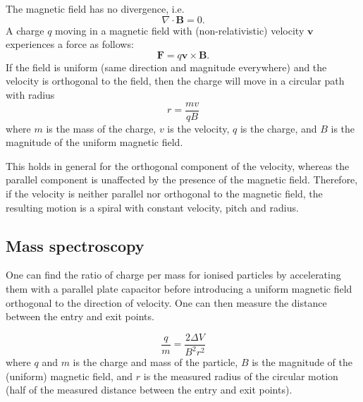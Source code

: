 \documentclass[a4paper, 12pt]{article}
\renewcommand{\vec}[1]{\bm{#1}}
\newcommand{\B}{\ensuremath{\vec{B}}}
\begin{document}
        The magnetic field has no divergence, i.e.
        \begin{equation}
            \nabla \cdot \B = 0.
        \end{equation}
        A charge $q$ moving in a magnetic field with (non-relativistic) velocity $\vec{v}$ experiences a force as follows: 
        \begin{equation}
            \vec{F} = q\vec{v}\times \B.
        \end{equation}
        If the field is uniform (same direction and magnitude everywhere) and the velocity is orthogonal to the field, 
        then the charge will move in a circular path with radius
        \begin{equation}
            r = \frac{mv}{qB}
        \end{equation}
        where $m$ is the mass of the charge, $v$ is the velocity, $q$ is the charge, 
        and $B$ is the magnitude of the uniform magnetic field.
        
        This holds in general for the orthogonal component of the velocity, 
        whereas the parallel component is unaffected by the presence of the magnetic field. 
        Therefore, if the velocity is neither parallel nor orthogonal to the magnetic field, 
        the resulting motion is a spiral with constant velocity, pitch and radius.
        
    \subsection{Mass spectroscopy}
        One can find the ratio of charge per mass for ionised particles by accelerating them with a parallel plate capacitor 
        before introducing a uniform magnetic field orthogonal to the direction of velocity. 
        One can then measure the distance between the entry and exit points.
        
        \begin{equation}
            \frac{q}{m} = \frac{2 \Delta V}{B^2 r^2}
        \end{equation}
        where $q$ and $m$ is the charge and mass of the particle, $B$ is the magnitude of the (uniform) magnetic field, 
        and $r$ is the measured radius of the circular motion (half of the measured distance between the entry and exit points).
        
\end{document}
